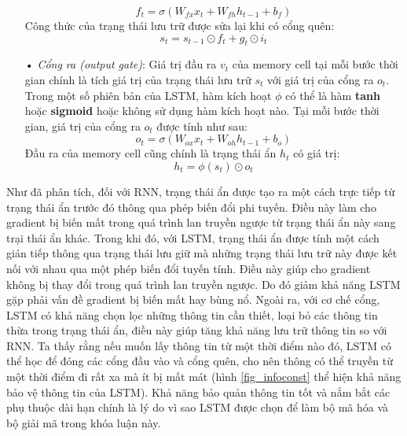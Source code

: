 \begin{itemize}
	\begin{equation} \label{forgetGateLSTM}
		f_t = \sigma \left(W_{fx}x_t + W_{fh}h_{t-1} + b_f \right)
	\end{equation}
	Công thức của trạng thái lưu trữ được sửa lại khi có cổng quên:
	\begin{equation} \label{cellStateWithForgetGateLSTM}
		s_t = s_{t-1} \odot f_t + g_t \odot i_t
	\end{equation}
	\item[•] \textit{Cổng ra (output gate)}: Giá trị đầu ra $v_t$ của memory cell tại mỗi bước thời gian chính là tích giá trị của trạng thái lưu trữ $s_t$ với giá trị của cổng ra $o_t$. Trong một số phiên bản của LSTM, hàm kích hoạt $\phi$ có thể là hàm \textbf{tanh} hoặc \textbf{sigmoid} hoặc không sử dụng hàm kích hoạt nào. Tại mỗi bước thời gian, giá trị của cổng ra $o_t$ được tính như sau:
	\begin{equation} \label{outputGateLSTM}
		o_t = \sigma \left(W_{ox}x_t + W_{oh}h_{t-1} + b_o \right)
	\end{equation}
	Đầu ra của memory cell cũng chính là trạng thái ẩn $h_t$ có giá trị:
	\begin{equation} \label{outputNodeLSTM}
		h_t = \phi(s_t) \odot o_t 
	\end{equation}
\end{itemize}

Như đã phân tích, đối với RNN, trạng thái ẩn được tạo ra một cách trực tiếp từ trạng thái ẩn trước đó thông qua phép biến đổi phi tuyến. Điều này làm cho gradient bị biến mất trong quá trình lan truyền ngược từ trạng thái ẩn này sang trại thái ẩn khác. Trong khi đó, với LSTM, trạng thái ẩn được tính một cách gián tiếp thông qua trạng thái lưu giữ mà những trạng thái lưu trữ này được kết nối với nhau qua một phép biến đổi tuyến tính. Điều này giúp cho gradient không bị thay đổi trong quá trình lan truyền ngược. Do đó giảm khả năng LSTM gặp phải vấn đề gradient bị biến mất hay bùng nổ. Ngoài ra, với cơ chế cổng, LSTM có khả năng chọn lọc những thông tin cần thiết, loại bỏ các thông tin thừa trong trạng thái ẩn, điều này giúp tăng khả năng lưu trữ thông tin so với RNN. Ta thấy rằng nếu muốn lấy thông tin từ một thời điểm nào đó, LSTM có thể học để đóng các cổng đầu vào và cổng quên, cho nên thông có thể truyền từ một thời điểm đi rất xa mà ít bị mất mát (hình \ref{fig_infoconst} thể hiện khả năng bảo vệ thông tin của LSTM). Khả năng bảo quản thông tin tốt và nắm bắt các phụ thuộc dài hạn chính là lý do vì sao LSTM được chọn để làm bộ mã hóa và bộ giải mã trong khóa luận này.

